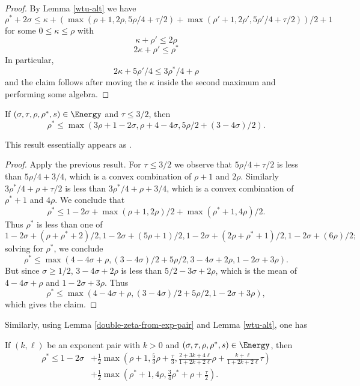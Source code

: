 \literature
{}

\begin{proof} By Lemma \ref{wtu-alt} we have
$$ \rho^* + 2\sigma \leq \kappa + ( \max( \rho+1, 2\rho, 5\rho/4+\tau/2)+ \max( \rho'+1, 2\rho', 5\rho'/4+\tau/2) )/2 + 1$$
for some $0 \leq \kappa \leq \rho$ with
$$ \kappa + \rho' \leq 2\rho$$
$$ 2\kappa + \rho' \leq \rho^*$$
In particular,
$$ 2\kappa + 5\rho'/4 \leq 3\rho^*/4 + \rho$$
and the claim follows after moving the $\kappa$ inside the second maximum and performing some algebra.
\end{proof}

\begin{corollary}\label{hb-energy-simp}  If $(\sigma,\tau,\rho,\rho^*,s) \in \Energy$ and $\tau \leq 3/2$, then
$$ \rho^* \leq \max(3 \rho + 1-2\sigma, \rho +4-4\sigma, 5\rho/2 + (3-4\sigma)/2).$$
\end{corollary}

\literature
{}

This result essentially appears as \cite[Lemma 3]{heathbrown_zero_1979}.

\begin{proof} Apply the previous result.  For $\tau \leq 3/2$ we observe that $5\rho/4+\tau/2$ is less than $5\rho/4 + 3/4$, which is a convex combination of $\rho+1$ and $2\rho$.  Similarly $3\rho^*/4+\rho+\tau/2$ is less than $3\rho^*/4+\rho+3/4$, which is a convex combination of $\rho^*+1$ and $4\rho$. We conclude that
$$ \rho^* \leq  1-2\sigma + \max(\rho+1, 2\rho)/2 + \max(\rho^*+1, 4\rho)/2.$$
Thus $\rho^*$ is less than one of
$$ 1-2\sigma + (\rho+\rho^*+2)/2, 1-2\sigma + (5\rho+1)/2, 1-2\sigma + (2\rho+\rho^*+1)/2, 1-2\sigma + (6\rho)/2;$$
solving for $\rho^*$, we conclude
$$ \rho^* \leq \max( 4-4\sigma + \rho, (3-4\sigma)/2 + 5\rho/2, 3-4\sigma + 2\rho, 1-2\sigma + 3\rho).$$
But since $\sigma \geq 1/2$, $3-4\sigma + 2\rho$ is less than $5/2-3\sigma + 2\rho$, which is the mean of $4-4\sigma+\rho$ and $1-2\sigma+3\rho$. Thus
$$ \rho^* \leq \max( 4-4\sigma + \rho, (3-4\sigma)/2 + 5\rho/2, 1-2\sigma + 3\rho),$$
which gives the claim.
\end{proof}

Similarly, using Lemma \ref{double-zeta-from-exp-pair} and Lemma \ref{wtu-alt}, one has

\begin{theorem}
If $(k, \ell)$ be an exponent pair with $k > 0$ and $(\sigma, \tau, \rho, \rho^*, s)\in \Energy$, then
\begin{align*}
\rho^* \le 1 - 2\sigma &+ \frac{1}{2}\max\left(\rho+1, \frac{5}{3}\rho + \frac{\tau}{3}, \frac{2+3k+4\ell}{1+2k+2\ell} \rho + \frac{k+\ell}{1+2k+2\ell} \tau\right)\\
&+ \frac{1}{2}\max\left(\rho^*+1, 4\rho, \frac{3}{4}\rho^*+\rho+\frac{\tau}{2}\right).
\end{align*}
\end{theorem}


